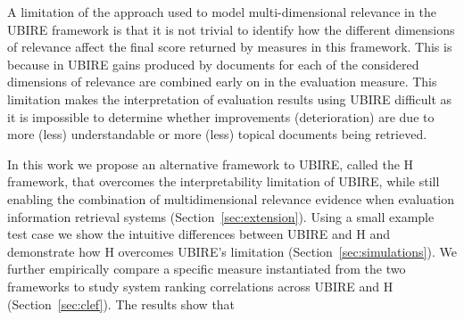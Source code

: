 
A limitation of the approach used to model multi-dimensional relevance in the UBIRE framework is that it is not trivial to identify how the different dimensions of relevance affect the final score returned by measures in this framework. This is because in UBIRE gains produced by documents for each of the considered dimensions of relevance are combined early on in the evaluation measure. This limitation makes the interpretation of evaluation results using UBIRE difficult as it is impossible to determine whether improvements (deterioration) are due to more (less) understandable or more (less) topical documents being retrieved. 

In this work we propose an alternative framework to UBIRE, called the H framework, that overcomes the interpretability limitation of UBIRE, while still enabling the combination of multidimensional relevance evidence when evaluation information retrieval systems (Section~\ref{sec:extension}). Using a small example test case we show the intuitive differences between UBIRE and H and demonstrate how H overcomes UBIRE's limitation (Section~\ref{sec:simulations}). We further empirically compare a specific measure instantiated from the two frameworks to study system ranking correlations across UBIRE and H (Section~\ref{sec:clef}). The results show that 



